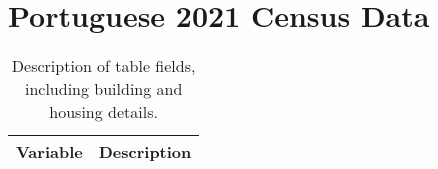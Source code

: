 
%
 
\chapter{Portuguese 2021 Census Data}
\label{app:pt_census}

\bgroup
\scriptsize
{}
\begin{xltabular}{\textwidth}{|p{0.4\textwidth}|p{0.6\textwidth}|}
  \caption{Description of table fields, including building and housing details.}
  \label{tab:field-description}\\
  \hline
  \textbf{Variable} & \textbf{Description} \\
  \hline
  

\end{xltabular}
